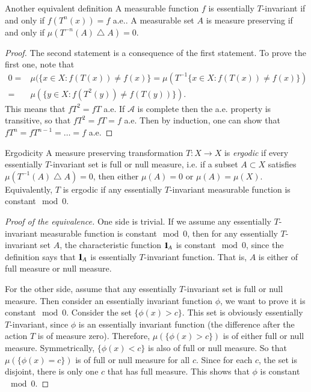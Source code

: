 \documentclass[12pt,a4paper]{article}
\begin{document}
	\begin{proposition}{Another equivalent definition}{}
		A measurable function $f$ is essentially $T$-invariant if and only if $f(T^n(x))=f$ a.e.. A measurable set $A$ is measure preserving if and only if $\mu(T^{-n}(A)\bigtriangleup A)=0$.
	\end{proposition}
	\begin{proof}
		The second statement is a consequence of the first statement. To prove the first one, note that 
		\begin{align*}
			0=&\mu(\{x\in X: f(T(x))\neq f(x)\}=\mu(T^{-1}\{x\in X: f(T(x))\neq f(x)\})\\
			= & \mu(\{y\in X:f(T^2(y))\neq f(T(y))\}).
		\end{align*}
		This means that $fT^2=fT$ a.e. If $\mathcal{A}$ is complete then the a.e. property is transitive, so that $fT^2=fT=f$ a.e. Then by induction, one can show that $fT^n=fT^{n-1}=\dots=f$ a.e.
	\end{proof}


	\begin{definition}{Ergodicity}{}
		A measure preserving transformation $T:X\rightarrow X$ is \emph{ergodic} if every essentially $T$-invariant set is full or null measure, i.e. if a subset $A\subset X$ satisfies $\mu(T^{-1}(A)\bigtriangleup A)=0$, then either $\mu(A)=0$ or $\mu(A)=\mu(X)$. Equivalently, $T$ is ergodic if any essentially $T$-invariant measurable function is constant$\mod 0$.
	\end{definition}
	
	\begin{proof}[Proof of the equivalence]
		One side is trivial. If we assume any essentially $T$-invariant measurable function is constant$\mod 0$, then for any essentially $T$-invariant set $A$, the characteristic function $\mathbf{1}_A$ is constant$\mod 0$, since the definition says that $\mathbf{1}_A$ is essentially $T$-invariant function. That is, $A$ is either of full measure or null measure.
		
		For the other side, assume that any essentially $T$-invariant set is full or null measure. Then consider an essentially invariant function $\phi$, we want to prove it is constant$\mod 0$. Consider the set $\{\phi(x)>c\}$. This set is obviously essentially $T$-invariant, since $\phi$ is an essentially invariant function (the difference after the action $T$ is of measure zero). Therefore, $\mu(\{\phi(x)>c\})$ is of either full or null measure. Symmetrically, $\{\phi(x)<c\}$ is also of full or null measure. So that $\mu(\{\phi(x)=c\})$ is of full or null measure for all $c$. Since for each $c$, the set is disjoint, there is only one $c$ that has full measure. This shows that $\phi$ is constant $\mod0$. 
	\end{proof}
	
\end{document}
